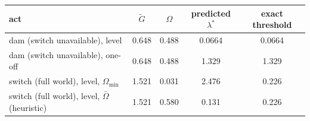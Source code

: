 \begin{tabular}{lcccc}
\toprule
act & $\tilde G$ & $\Omega$ & predicted $\lambda^*$ & exact threshold \\
\midrule
dam (switch unavailable), level & 0.648 & 0.488 & 0.0664 & 0.0664 \\
dam (switch unavailable), one-off & 0.648 & 0.488 & 1.329 & 1.329 \\
switch (full world), level, $\Omega_{\min}$ & 1.521 & 0.031 & 2.476 & 0.226 \\
switch (full world), level, $\bar\Omega$ (heuristic) & 1.521 & 0.580 & 0.131 & 0.226 \\
\bottomrule
\end{tabular}
